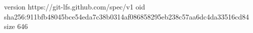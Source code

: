 version https://git-lfs.github.com/spec/v1
oid sha256:911bfb48045bce54eda7c38b0314af086858295eb238c57aa6dc4da33516cd84
size 646
